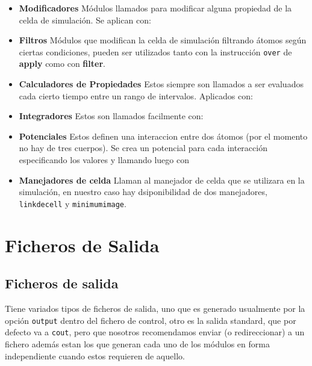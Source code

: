 \begin{itemize}
 \item \textbf{Modificadores}
  M\'odulos llamados para modificar alguna propiedad de la celda de simulaci\'on. Se aplican con:
 \item \textbf{Filtros}
  M\'odulos que modifican la celda de simulaci\'on filtrando \'atomos seg\'un ciertas condiciones, pueden ser
  utilizados tanto con la instrucci\'on \verb|over| de \textbf{apply} como con \textbf{filter}.
 \item \textbf{Calculadores de Propiedades}
  Estos siempre son llamados a ser evaluados cada cierto tiempo entre un rango de intervalos. Aplicados con:
 \item \textbf{Integradores}
  Estos son llamados facilmente con:
 \item \textbf{Potenciales}
  Estos definen una interaccion entre dos \'atomos (por el momento no hay de tres cuerpos). Se crea un potencial para cada interacci\'on especificando los valores y llamando luego con
 \item \textbf{Manejadores de celda}
  Llaman al manejador de celda que se utilizara en la simulaci\'on, en nuestro caso hay dsiponibilidad de dos manejadores, \verb|linkdecell| y \verb|minimumimage|.
\end{itemize}

\section{Ficheros de Salida}

\subsection{Ficheros de salida}
{\lpmd} Tiene variados tipos de ficheros de salida, uno que es generado usualmente por la opci\'on \verb|output| dentro del fichero de control, otro es la salida standard, que por defecto va a \verb|cout|, pero que nosotros recomendamos enviar (o redireccionar) a un fichero adem\'as estan los que generan cada uno de los m\'odulos en forma independiente cuando estos requieren de aquello.

